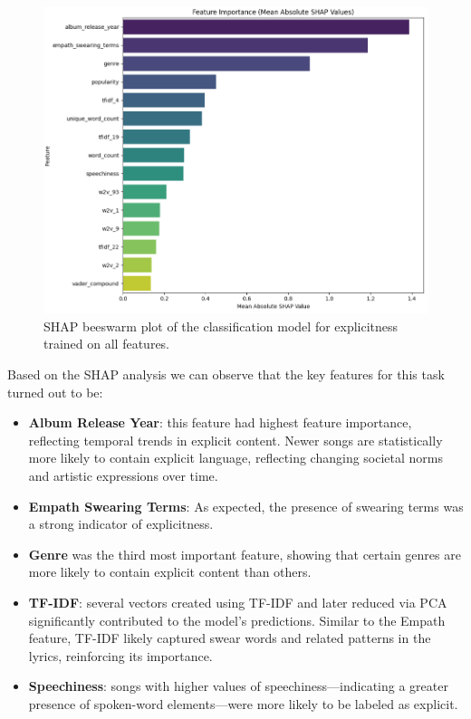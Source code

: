 \begin{center}
\begin{figure}[H]
  \centering
  \includegraphics[width=5in]{img/feature_importance_explicitness.png}
  \caption{SHAP beeswarm plot of the classification model for explicitness  trained on all features.}
  \label{Figure:fig_beh}
\end{figure}
\end{center}


Based on the SHAP analysis we can observe that the key features for this task
turned out to be:
\begin{itemize}
  \item \textbf{Album Release Year}: this feature had  highest feature
    importance, reflecting temporal trends in explicit content. Newer songs are
    statistically more likely to contain explicit language, reflecting changing
    societal norms and artistic expressions over time.
  \item \textbf{Empath Swearing Terms}: As expected, the presence of swearing
    terms was a strong indicator of explicitness.
  \item \textbf{Genre} was the third most important feature, showing that
    certain genres  are more likely to contain explicit content than others.
  \item \textbf{TF-IDF}: several vectors created using TF-IDF and later reduced
    via PCA significantly contributed to the model's predictions. Similar to
    the Empath feature, TF-IDF likely captured swear words and related patterns
    in the lyrics, reinforcing its importance.
  \item \textbf{Speechiness}: songs with higher values of
    speechiness—indicating a greater presence of spoken-word elements—were more
    likely to be labeled as explicit.
\end{itemize}




